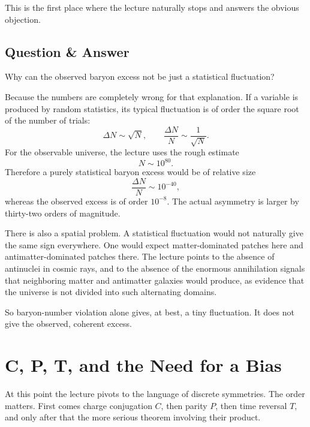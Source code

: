 This is the first place where the lecture naturally stops and answers the obvious objection.

\subsection{Question \& Answer}

Why can the observed baryon excess not be just a statistical fluctuation?

Because the numbers are completely wrong for that explanation. If a variable is produced by random statistics, its typical fluctuation is of order the square root of the number of trials:
\begin{equation}
\Delta N \sim \sqrt{N},
\qquad
\frac{\Delta N}{N}\sim \frac{1}{\sqrt{N}}.
\end{equation}
For the observable universe, the lecture uses the rough estimate
\begin{equation}
N \sim 10^{80}.
\end{equation}
Therefore a purely statistical baryon excess would be of relative size
\begin{equation}
\frac{\Delta N}{N}\sim 10^{-40},
\end{equation}
whereas the observed excess is of order \(10^{-8}\). The actual asymmetry is larger by thirty-two orders of magnitude.

There is also a spatial problem. A statistical fluctuation would not naturally give the same sign everywhere. One would expect matter-dominated patches here and antimatter-dominated patches there. The lecture points to the absence of antinuclei in cosmic rays, and to the absence of the enormous annihilation signals that neighboring matter and antimatter galaxies would produce, as evidence that the universe is not divided into such alternating domains.

So baryon-number violation alone gives, at best, a tiny fluctuation. It does not give the observed, coherent excess.

\section{C, P, T, and the Need for a Bias}

At this point the lecture pivots to the language of discrete symmetries. The order matters. First comes charge conjugation \(C\), then parity \(P\), then time reversal \(T\), and only after that the more serious theorem involving their product.

